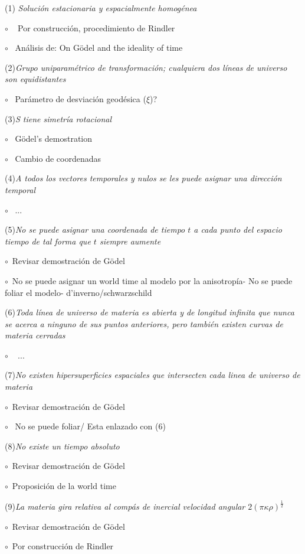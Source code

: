 \documentclass[11pt]{book}
\begin{document}
(1) \emph{Solución estacionaria y espacialmente homogénea}  

$\circ $ ~ Por construcción,  procedimiento de Rindler

$\circ$~ Análisis de: On Gödel and the ideality of time

(2)\emph{Grupo uniparamétrico de transformación; cualquiera dos líneas de universo son equidistantes}

$\circ$~ Parámetro de desviación geodésica ($\xi$)?

(3)\emph{S tiene simetría rotacional}

$\circ$~ Gödel's demostration

$\circ$~ Cambio de coordenadas

(4)\emph{A todos los vectores temporales y nulos se les puede asignar una dirección temporal}

$\circ$~ ...

(5)\emph{No se puede asignar una coordenada de tiempo $t$ a cada punto del espacio tiempo de tal forma que $t$ siempre aumente}

$\circ$~Revisar demostración de Gödel

$\circ$~No se puede asignar un world time al modelo por la anisotropía- No se puede foliar el modelo- d'inverno/schwarzschild

(6)\emph{Toda línea de universo de materia es abierta y de longitud infinita que nunca se acerca a ninguno de sus puntos anteriores, pero también existen curvas de materia cerradas}

$\circ$ ~ ...

(7)\emph{No existen hipersuperficies espaciales que intersecten cada linea de universo de materia}

$\circ$~Revisar demostración de Gödel

$\circ$~ No se puede foliar/ Esta enlazado con (6)

(8)\emph{No existe un tiempo absoluto}

$\circ$~Revisar demostración de Gödel

$\circ$~Proposición de la world time

(9)\emph{La materia gira relativa al compás de inercial velocidad angular $2(\pi\kappa\rho)^\frac{1}{2}$}

$\circ$~Revisar demostración de Gödel

$\circ$~Por construcción de Rindler

\end{document}
